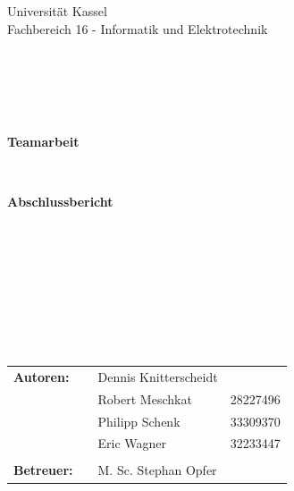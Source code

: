 \documentclass[a4paper,12pt,headsepline]{scrartcl}
\begin{document}
	
	\begin{verbatim}
	
	
	\end{verbatim}
	
	\begin{center}
		\Large{Universität Kassel}\\
		\Large{Fachbereich 16 - Informatik und Elektrotechnik}\\
	\end{center}
	
	
	\begin{verbatim}
	
	
	
	
	\end{verbatim}
	\begin{center}
		\doublespacing
		\textbf{\LARGE{Teamarbeit}}\\
		\singlespacing
		\begin{verbatim}
		
		\end{verbatim}
		\textbf{Abschlussbericht}
	\end{center}
	\begin{verbatim}
	
	\end{verbatim}
	\begin{center}
		
	\end{center}
	\begin{verbatim}
	
	\end{verbatim}
	\begin{center}
		
	\end{center}
	\begin{verbatim}
	
	
	
	
	\end{verbatim}
	\begin{flushleft}
		\begin{tabular}{llll}
			\textbf{Autoren:} & & Dennis Knitterscheidt & \\
			& & Robert Meschkat & 28227496\\
			& & Philipp Schenk & 33309370\\
			& & Eric Wagner & 32233447\\ \\
			\textbf{Betreuer:} & & M. Sc. Stephan Opfer &\\
		\end{tabular}
	\end{flushleft}
	\newpage
	
\end{document}
